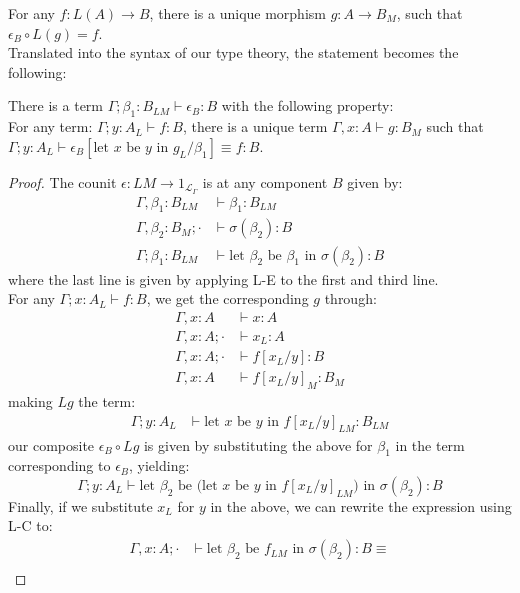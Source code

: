 For any $f : L(A) \to B$, there is a unique morphism $g : A \to B_M$, such that $\epsilon_B \circ L(g) = f$.\\
Translated into the syntax of our type theory, the statement becomes the following:\\
\begin{thm}[$L \dashv M$]
There is a term $\Gamma; \beta_1 : B_{LM} \vdash \epsilon_B: B$ with the following property:\\
For any term: $\Gamma; y : A_L \vdash f : B$, there is a unique term $\Gamma, x : A \vdash g : B_{M}$ such that $\Gamma; y : A_L \vdash \epsilon_B[\text{let $x$ be $y$ in }g_L/\beta_1] \equiv f : B$.\\
\begin{proof}
 The counit $\epsilon : LM \to 1_{\mathcal{L}_{\Gamma}}$ is at any component $B$ given by:
 \[
  \begin{split}
    \Gamma, \beta_1 : B_{LM} &\vdash \beta_1 : B_{LM}\\
    \Gamma, \beta_2 : B_{M}; \cdot &\vdash \sigma(\beta_2) : B\\
    \Gamma; \beta_1 : B_{LM} &\vdash \text{let $\beta_2$ be $\beta_1$ in }\sigma(\beta_2) : B 
  \end{split}
\]
  where the last line is given by applying L-E to the first and third line.\\
  For any $\Gamma; x : A_L \vdash f : B$, we get the corresponding $g$ through:
  \[
    \begin{split}
      \Gamma, x : A &\vdash x : A\\
      \Gamma, x : A; \cdot &\vdash x_L : A\\
      \Gamma, x : A; \cdot &\vdash f[x_L/y] : B\\
      \Gamma, x : A &\vdash f[x_L/y]_M : B_M
      \end{split}
    \]
    making $Lg$ the term:
\[
  \begin{split}
    \Gamma; y : A_L &\vdash \text{let $x$ be $y$ in } f[x_L/y]_{LM} : B_{LM}
  \end{split}
\]
our composite $\epsilon_B \circ Lg$ is given by substituting the above for $\beta_1$ in the term corresponding to $\epsilon_B$, yielding:
\[
  \Gamma; y : A_L \vdash \text{let $\beta_2$ be (let $x$ be $y$ in $f[x_L/y]_{LM}$) in }\sigma(\beta_2) : B
\]
Finally, if we substitute $x_L$ for $y$ in the above, we can rewrite the expression using L-C to:
\[
  \begin{split}
    \Gamma, x : A; \cdot &\vdash \text{let $\beta_2$ be $f_{LM}$ in }\sigma(\beta_2) : B \equiv \\

\end{split}\]
\end{proof}
\end{thm}

